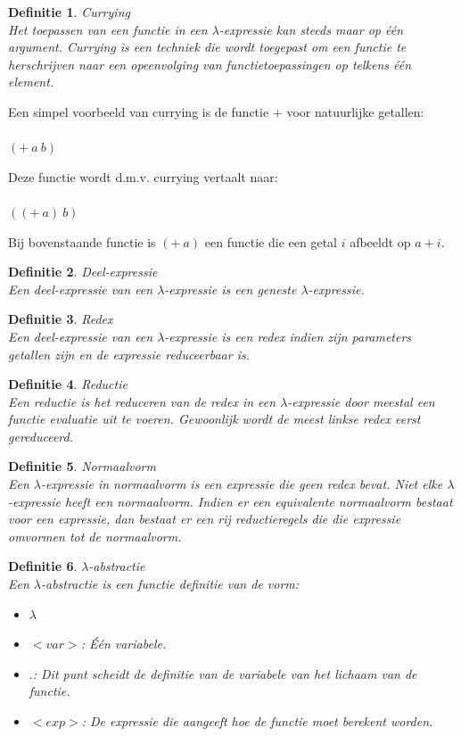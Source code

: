 \documentclass[a4paper]{article}
\newtheorem{tdefinitie}{Definitie}[section]
\newenvironment{definitie}[1]%
  {\begin{mdframed}[backgroundcolor=silver,
    topline=false,
    rightline=false,
    leftline=false,
    bottomline=false]\begin{tdefinitie}#1\\\normalfont}%
  {\end{tdefinitie}\end{mdframed}}
\newcommand{\nat}{\ensuremath{\mathbb{N}}}
\begin{document}
\begin{definitie}{Currying}
  Het toepassen van een functie in een $\lambda$-expressie kan steeds maar op \'e\'en argument. Currying is een techniek die wordt toegepast om een functie te herschrijven naar een opeenvolging van functietoepassingen op telkens \'e\'en element.
\end{definitie}

Een simpel voorbeeld van currying is de functie $+$ voor natuurlijke getallen:\\
\bm{$+: \nat \times \nat \rightarrow \nat$}\\
$(+\ a\ b)$

Deze functie wordt d.m.v. currying vertaalt naar:\\
\bm{$+: \nat \rightarrow (\nat \rightarrow \nat)$}\\
$((+\ a)\ b)$

Bij bovenstaande functie is $(+\ a)$ een functie die een getal $i$ afbeeldt op $a + i$.

\begin{definitie}{Deel-expressie}
  Een deel-expressie van een $\lambda$-expressie is een geneste $\lambda$-expressie.
\end{definitie}

\begin{definitie}{Redex}
  Een deel-expressie van een $\lambda$-expressie is een redex indien zijn parameters getallen zijn en de expressie reduceerbaar is.
\end{definitie}

\begin{definitie}{Reductie}
  Een reductie is het reduceren van de redex in een $\lambda$-expressie door meestal een functie evaluatie uit te voeren. Gewoonlijk wordt de meest linkse redex eerst gereduceerd.
\end{definitie}

\begin{definitie}{Normaalvorm}
  Een $\lambda$-expressie in normaalvorm is een expressie die geen redex bevat. Niet elke $\lambda$-expressie heeft een normaalvorm. Indien er een equivalente normaalvorm bestaat voor een expressie, dan bestaat er een rij reductieregels die die expressie omvormen tot de normaalvorm.
\end{definitie}

\begin{definitie}{$\lambda$-abstractie}
  Een $\lambda$-abstractie is een functie definitie van de vorm:
  \begin{itemize}
  \item $\lambda$
  \item $<var>$: \'E\'en variabele.
  \item $.$: Dit punt scheidt de definitie van de variabele van het lichaam van de functie.
  \item $<exp>$: De expressie die aangeeft hoe de functie moet berekent worden.
  \end{itemize}
\end{definitie}
\end{document}
